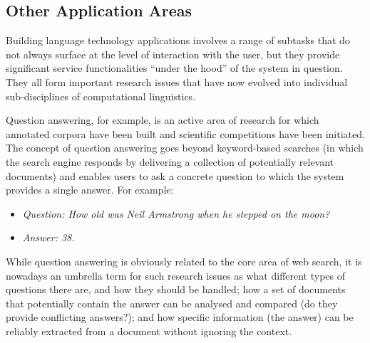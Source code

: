\documentclass[]{../../metanetpaper}
\begin{document}
\begin{multicols}{2}





\subsection{Other Application Areas}


Building language technology applications involves a range of subtasks that do
not always surface at the level of interaction with the user, but they provide
significant service functionalities “under the hood” of the system in question.
They all form important research issues that have now evolved into individual
sub-disciplines of computational linguistics.

Question answering, for example, is an active area of research for which
annotated corpora have been built and scientific competitions have been
initiated. The concept of question answering goes beyond keyword-based searches
(in which the search engine responds by delivering a collection of potentially
relevant documents) and enables users to ask a concrete question to which the
system provides a single answer. For example:
\begin{itemize}
\item[] \textit{Question: How old was Neil Armstrong when he stepped on the
              moon?}

\item[] \textit{Answer: 38.}
\end{itemize}
While question answering is obviously related to the core area of web search,
it is nowadays an umbrella term for such research issues as what different
types of questions there are, and how they should be handled; how a set of
documents that potentially contain the answer can be analysed and compared (do
they provide conflicting answers?); and how specific information (the answer)
can be reliably extracted from a document without ignoring the context.


\end{multicols}
\end{document}
